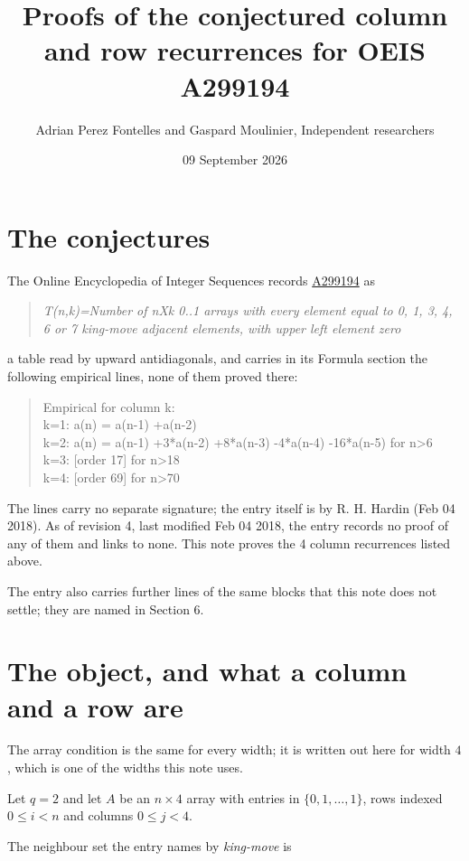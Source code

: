 \documentclass[11pt]{article}
\title{Proofs of the conjectured column and row recurrences for OEIS A299194}
\author{Adrian Perez Fontelles and Gaspard Moulinier, Independent researchers}
\date{09 September 2026}
\theoremstyle{definition}
\begin{document}
\maketitle
\section{The conjectures}

The Online Encyclopedia of Integer Sequences records \href{https://oeis.org/A299194}{A299194} as

\begin{quote}\itshape T(n,k)=Number of nXk 0..1 arrays with every element equal to 0, 1, 3, 4, 6 or 7 king-move adjacent elements, with upper left element zero\end{quote}

a table read by upward antidiagonals, and carries in its Formula section the following empirical lines, none of them proved there:

\begin{quote}\ttfamily Empirical for column k:\\
k=1: a(n) = a(n-1) +a(n-2)\\k=2: a(n) = a(n-1) +3*a(n-2) +8*a(n-3) -4*a(n-4) -16*a(n-5) for n>6\\k=3: [order 17] for n>18\\k=4: [order 69] for n>70\end{quote}

The lines carry no separate signature; the entry itself is by R. H. Hardin (Feb 04 2018). As of revision 4, last modified Feb 04 2018, the entry records no proof of any of them and links to none. This note proves the 4 column recurrences listed above.

The entry also carries further lines of the same blocks that this note does not settle; they are named in Section 6.

\section{The object, and what a column and a row are}

The array condition is the same for every width; it is written out here for width $4$, which is one of the widths this note uses.

Let $q = 2$ and let $A$ be an $n \times 4$ array with entries in $\{0,1,\dots,1\}$, rows indexed $0 \le i < n$ and columns $0 \le j < 4$.

The neighbour set the entry names by {\itshape king-move} is
\end{document}
